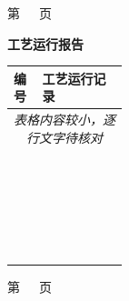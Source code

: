 \documentclass[UTF8,10pt,a4paper,fontset=fandol]{ctexart}
\begin{document}
\begin{center}
\begin{minipage}[t]{0.47\textwidth}
\vspace{0.4em}
{\tiny 第\ \ \ 页}
\end{minipage}
\hfill
\begin{minipage}[t]{0.47\textwidth}
\centering
\textbf{工艺运行报告}

\vspace{0.3em}
\scriptsize
\begin{tabularx}{\linewidth}{|p{0.25\linewidth}|X|}
\hline
编号 & 工艺运行记录 \\
\hline
\multicolumn{2}{|c|}{\textit{表格内容较小，逐行文字待核对}}\\
\hline
\multicolumn{2}{|c|}{}\\
\hline
\multicolumn{2}{|c|}{}\\
\hline
\multicolumn{2}{|c|}{}\\
\hline
\multicolumn{2}{|c|}{}\\
\hline
\multicolumn{2}{|c|}{}\\
\hline
\multicolumn{2}{|c|}{}\\
\hline
\multicolumn{2}{|c|}{}\\
\hline
\multicolumn{2}{|c|}{}\\
\hline
\multicolumn{2}{|c|}{}\\
\hline
\multicolumn{2}{|c|}{}\\
\hline
\multicolumn{2}{|c|}{}\\
\hline
\multicolumn{2}{|c|}{}\\
\hline
\multicolumn{2}{|c|}{}\\
\hline
\multicolumn{2}{|c|}{}\\
\hline
\multicolumn{2}{|c|}{}\\
\hline
\multicolumn{2}{|c|}{}\\
\hline
\multicolumn{2}{|c|}{}\\
\hline
\multicolumn{2}{|c|}{}\\
\hline
\multicolumn{2}{|c|}{}\\
\hline
\multicolumn{2}{|c|}{}\\
\hline
\multicolumn{2}{|c|}{}\\
\hline
\multicolumn{2}{|c|}{}\\
\hline
\multicolumn{2}{|c|}{}\\
\hline
\multicolumn{2}{|c|}{}\\
\hline
\end{tabularx}

\vspace{0.4em}
{\tiny 第\ \ \ 页}
\end{minipage}


\end{center}
\end{document}
